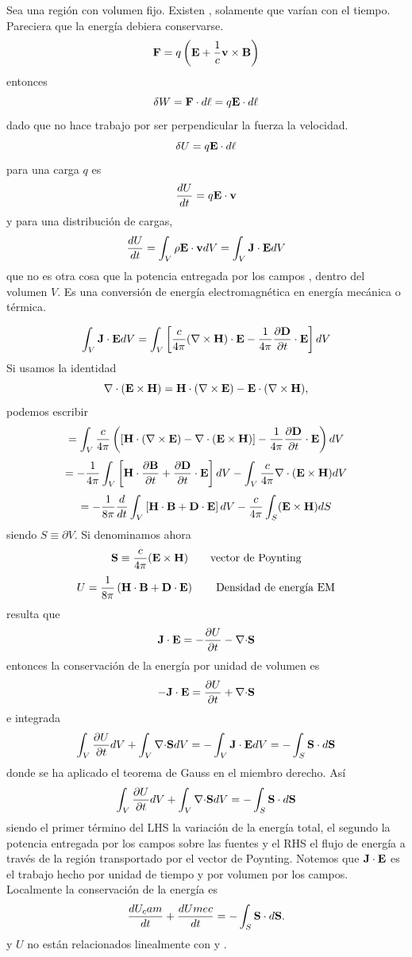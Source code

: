\documentclass[10pt,oneside]{CBFT_book}
\begin{document}
Sea una región con volumen fijo. Existen ,  solamente que varían con el tiempo.
Pareciera que la energía debiera conservarse.
\[
	\vb{F} = q \left( \vb{E} + \frac{1}{c} \pv{v}{B} \right)
\]
entonces
\[
	\delta W = \vb{F}\cdot d\vb{\ell} = q \vb{E}\cdot d\vb{\ell} 
\]
dado que  no hace trabajo por ser perpendicular la fuerza la velocidad.
\[
	\delta U = q \vb{E}\cdot d\vb{\ell} 
\]
para una carga $q$ es
\[
	\dtot{U}{t} = q \vb{E}\cdot \vb{v} 
\]
y para una distribución de cargas,
\[
	\dtot{U}{t} = \int_V \rho \vb{E}\cdot \vb{v}  dV = \int_V \vb{J}\cdot \vb{E} dV
\]
que no es otra cosa que la potencia entregada por los campos ,  dentro del volumen
$V$. Es una conversión de energía electromagnética en energía mecánica o térmica.

\[
	\int_V \vb{J}\cdot \vb{E} dV = \int_V \left[ \frac{c}{4\pi}(\rotorm{H})\cdot\vb{E} - 
		\frac{1}{4\pi}\dpar{\vb{D}}{t}\cdot\vb{E} \right] dV
\]
Si usamos la identidad
\[
	\Nabla\cdot(\pv{E}{H}) = \vb{H}\cdot(\rotorm{E}) - \vb{E}\cdot(\rotorm{H}),
\]
podemos escribir
\[
	= \int_V \frac{c}{4\pi} \left( \left[ \vb{H}\cdot(\rotorm{E}) - \Nabla\cdot(\pv{E}{H}) \right] - 
		\frac{1}{4\pi}\dpar{\vb{D}}{t}\cdot\vb{E}  \right) dV
\]
\[
	= - \frac{1}{4\pi}\int_V \left[ \vb{H}\cdot\dpar{\vb{B}}{t} + \dpar{\vb{D}}{t}\cdot\vb{E} \right] dV - 
		\int_V \frac{c}{4\pi}  \Nabla\cdot(\pv{E}{H}) dV
\]
\[
	= - \frac{1}{8\pi}\frac{d}{dt} \int_V \left[ \vb{H}\cdot\vb{B} + \vb{D}\cdot\vb{E} \right] dV - 
		 \frac{c}{4\pi} \int_S (\pv{E}{H}) dS
\]
siendo $S\equiv\partial V$. Si denominamos ahora
\[
	\vb{S} \equiv \frac{c}{4\pi}(\pv{E}{H}) \qquad \text{vector de Poynting}
\]
\[
	U = \frac{1}{8\pi}\left( \vb{H}\cdot\vb{B} + \vb{D}\cdot\vb{E} \right) \qquad \text{Densidad de energía EM}
\]
resulta que 
\[
	\pe{J}{E} = -\dpar{U}{t} - \divem{S}
\]
entonces la conservación de la energía por unidad de volumen es
\[
	-\pe{J}{E} = \dpar{U}{t} + \divem{S}
\]
e integrada
\[
	\int_V \dpar{U}{t} dV + \int_V \divem{S} dV = - \int_V \pe{J}{E} dV = -\int_S \vb{S}\cdot d\vb{S}
\]
donde se ha aplicado el teorema de Gauss en el miembro derecho. Así
\[
	\int_V \dpar{U}{t} dV + \int_V \divem{S} dV = -\int_S \vb{S}\cdot d\vb{S}
\]
siendo el primer término del LHS la variación de la energía total, el segundo la potencia entregada por
los campos sobre las fuentes y el RHS el flujo de energía a través de la región transportado por el
vector de Poynting.
Notemos que $\pe{J}{E}$ es el trabajo hecho por unidad de tiempo y por volumen por los campos.
Localmente la conservación de la energía es
\[
	\dtot{U_cam}{t} + \dtot{Umec}{t} = -\int_S \vb{S}\cdot d\vb{S}.
\]
 y $U$ no están relacionados linealmente con  y .
\end{document}
